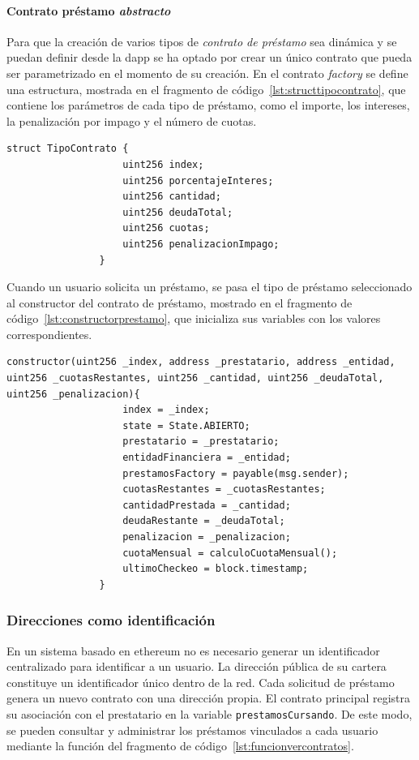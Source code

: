 \paragraph{Contrato préstamo \textit{abstracto}}
Para que la creación de varios tipos de \textit{contrato de préstamo}  sea dinámica
y se puedan definir desde la \gls{dapp} 
se ha optado por crear un único contrato que pueda ser parametrizado en el 
momento de su creación.
En el contrato \textit{factory} se define una estructura, mostrada en el fragmento de código~\ref{lst:structtipocontrato}, que contiene los
parámetros de cada tipo de préstamo, como el importe, los intereses, 
la penalización por impago y el número de cuotas. 
            \begin{lstlisting}[language=Solidity, caption={struct TipoContrato},label={lst:structtipocontrato}] 
                struct TipoContrato {
                    uint256 index;
                    uint256 porcentajeInteres; 
                    uint256 cantidad; 
                    uint256 deudaTotal;
                    uint256 cuotas;
                    uint256 penalizacionImpago;
                }
            \end{lstlisting}
            
Cuando un usuario solicita un préstamo, 
se pasa el tipo de préstamo seleccionado al constructor del contrato de préstamo, mostrado en el fragmento de código~\ref{lst:constructorprestamo},
que inicializa sus variables con los valores correspondientes.
            \begin{lstlisting}[language=Solidity, caption={Constructor de PrestamoCursando},label={lst:constructorprestamo}]
                constructor(uint256 _index, address _prestatario, address _entidad, uint256 _cuotasRestantes, uint256 _cantidad, uint256 _deudaTotal, uint256 _penalizacion){
                    index = _index;
                    state = State.ABIERTO;
                    prestatario = _prestatario;
                    entidadFinanciera = _entidad;
                    prestamosFactory = payable(msg.sender);
                    cuotasRestantes = _cuotasRestantes;
                    cantidadPrestada = _cantidad;
                    deudaRestante = _deudaTotal;
                    penalizacion = _penalizacion;
                    cuotaMensual = calculoCuotaMensual();
                    ultimoCheckeo = block.timestamp;
                }
            \end{lstlisting}
\subsubsection{Direcciones como identificación}
En un sistema basado en \gls{ethereum} no es necesario generar un identificador centralizado para identificar a un usuario.
La dirección pública de su cartera constituye un identificador único dentro de la red.
Cada solicitud de préstamo genera un nuevo contrato con una dirección propia.
El contrato principal registra su asociación con el prestatario en la variable
\texttt{prestamosCursando}. De este modo, se pueden consultar y administrar los
préstamos vinculados a cada usuario mediante la función del
fragmento de código~\ref{lst:funcionvercontratos}.

